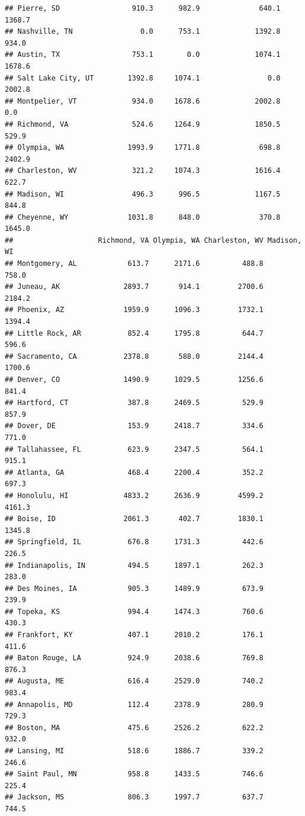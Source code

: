 \documentclass[
]{article}
\begin{document}
\begin{verbatim}
## Pierre, SD                 910.3      982.9              640.1         1368.7
## Nashville, TN                0.0      753.1             1392.8          934.0
## Austin, TX                 753.1        0.0             1074.1         1678.6
## Salt Lake City, UT        1392.8     1074.1                0.0         2002.8
## Montpelier, VT             934.0     1678.6             2002.8            0.0
## Richmond, VA               524.6     1264.9             1850.5          529.9
## Olympia, WA               1993.9     1771.8              698.8         2402.9
## Charleston, WV             321.2     1074.3             1616.4          622.7
## Madison, WI                496.3      996.5             1167.5          844.8
## Cheyenne, WY              1031.8      848.0              370.8         1645.0
##                    Richmond, VA Olympia, WA Charleston, WV Madison, WI
## Montgomery, AL            613.7      2171.6          488.8       758.0
## Juneau, AK               2893.7       914.1         2700.6      2184.2
## Phoenix, AZ              1959.9      1096.3         1732.1      1394.4
## Little Rock, AR           852.4      1795.8          644.7       596.6
## Sacramento, CA           2378.8       588.0         2144.4      1700.6
## Denver, CO               1490.9      1029.5         1256.6       841.4
## Hartford, CT              387.8      2469.5          529.9       857.9
## Dover, DE                 153.9      2418.7          334.6       771.0
## Tallahassee, FL           623.9      2347.5          564.1       915.1
## Atlanta, GA               468.4      2200.4          352.2       697.3
## Honolulu, HI             4833.2      2636.9         4599.2      4161.3
## Boise, ID                2061.3       402.7         1830.1      1345.8
## Springfield, IL           676.8      1731.3          442.6       226.5
## Indianapolis, IN          494.5      1897.1          262.3       283.0
## Des Moines, IA            905.3      1489.9          673.9       239.9
## Topeka, KS                994.4      1474.3          760.6       430.3
## Frankfort, KY             407.1      2010.2          176.1       411.6
## Baton Rouge, LA           924.9      2038.6          769.8       876.3
## Augusta, ME               616.4      2529.0          740.2       983.4
## Annapolis, MD             112.4      2378.9          280.9       729.3
## Boston, MA                475.6      2526.2          622.2       932.0
## Lansing, MI               518.6      1886.7          339.2       246.6
## Saint Paul, MN            958.8      1433.5          746.6       225.4
## Jackson, MS               806.3      1997.7          637.7       744.5

\end{verbatim}
\end{document}
